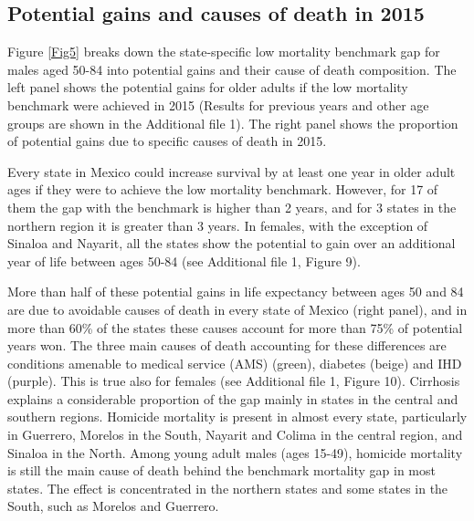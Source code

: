 \documentclass{bmcart}
\begin{document}
\subsection*{Potential gains and causes of death in 2015}

Figure \ref{Fig5} breaks down the state-specific low mortality benchmark gap for males aged 50-84 into potential gains and their cause of death composition. The left panel shows the potential gains for older adults if the low mortality benchmark were achieved in 2015 (Results for previous years and other age groups are shown in the Additional file 1). The right panel shows the proportion of potential gains due to specific causes of death in 2015.

Every state in Mexico could increase survival by at least one year in older adult ages if they were to achieve the low mortality benchmark. However, for 17 of them the gap with the benchmark is higher than 2 years, and for 3 states in the northern region it is greater than 3 years. In females, with the exception of Sinaloa and Nayarit, all the states show the potential to gain over an additional year of life between ages 50-84 (see Additional file 1, Figure 9). %

More than half of these potential gains in life expectancy between ages 50 and 84 are due to avoidable causes of death in every state of Mexico (right panel), and in more than 60\% of the states these causes account for more than 75\% of potential years won. The three main causes of death accounting for these differences are conditions amenable to medical service (AMS) (green), diabetes (beige) and IHD (purple). This is true also for females (see Additional file 1, Figure 10). Cirrhosis explains a considerable proportion of the gap mainly in states in the central and southern regions. Homicide mortality is present in almost every state, particularly in Guerrero, Morelos in the South, Nayarit and Colima in the central region, and Sinaloa in the North. Among young adult males (ages 15-49), homicide mortality is still the main cause of death behind the benchmark mortality gap in most states. The effect is concentrated in the northern states and some states in the South, such as Morelos and Guerrero.
\end{document}
